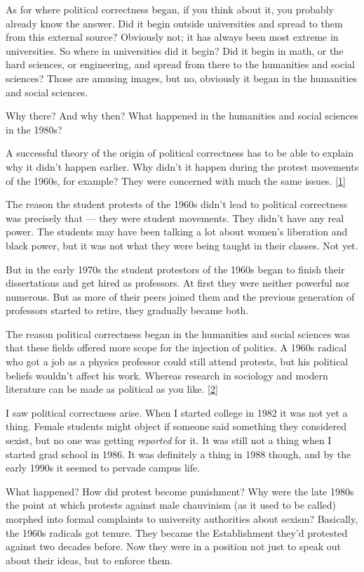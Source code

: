 As for where political correctness began, if you think about it, you
probably already know the answer. Did it begin outside universities and
spread to them from this external source? Obviously not; it has always
been most extreme in universities. So where in universities did it
begin? Did it begin in math, or the hard sciences, or engineering, and
spread from there to the humanities and social sciences? Those are
amusing images, but no, obviously it began in the humanities and social
sciences.

Why there? And why then? What happened in the humanities and social
sciences in the 1980s?

A successful theory of the origin of political correctness has to be
able to explain why it didn't happen earlier. Why didn't it happen
during the protest movements of the 1960s, for example? They were
concerned with much the same issues. {[}\hyperref[f1n]{1}{]}

The reason the student protests of the 1960s didn't lead to political
correctness was precisely that --- they were student movements. They
didn't have any real power. The students may have been talking a lot
about women's liberation and black power, but it was not what they were
being taught in their classes. Not yet.

But in the early 1970s the student protestors of the 1960s began to
finish their dissertations and get hired as professors. At first they
were neither powerful nor numerous. But as more of their peers joined
them and the previous generation of professors started to retire, they
gradually became both.

The reason political correctness began in the humanities and social
sciences was that these fields offered more scope for the injection of
politics. A 1960s radical who got a job as a physics professor could
still attend protests, but his political beliefs wouldn't affect his
work. Whereas research in sociology and modern literature can be made as
political as you like. {[}\hyperref[f2n]{2}{]}

I saw political correctness arise. When I started college in 1982 it was
not yet a thing. Female students might object if someone said something
they considered sexist, but no one was getting \emph{reported} for it.
It was still not a thing when I started grad school in 1986. It was
definitely a thing in 1988 though, and by the early 1990s it seemed to
pervade campus life.

What happened? How did protest become punishment? Why were the late
1980s the point at which protests against male chauvinism (as it used to
be called) morphed into formal complaints to university authorities
about sexism? Basically, the 1960s radicals got tenure. They became the
Establishment they'd protested against two decades before. Now they were
in a position not just to speak out about their ideas, but to enforce
them.

